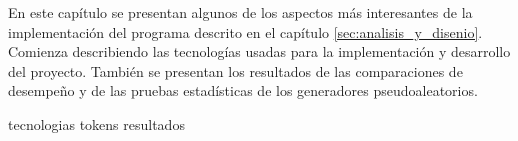 %
%
%

%
En este capítulo se presentan algunos de los aspectos más interesantes de
la implementación del programa descrito en el capítulo
\ref{sec:analisis_y_disenio}. Comienza describiendo las tecnologías
usadas para la implementación y desarrollo del proyecto. También se presentan
los resultados de las comparaciones de desempeño y de las pruebas estadísticas
de los generadores pseudoaleatorios.

{tecnologias}
{tokens}
{resultados}
